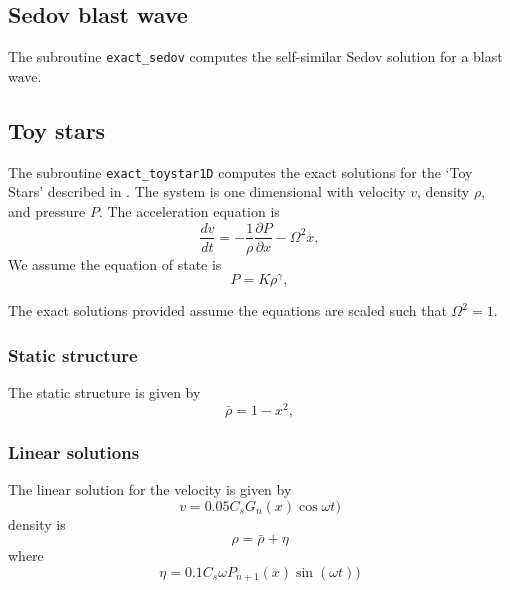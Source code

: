 \documentclass[a4paper,10pt]{article}
\begin{document}
\subsection{Sedov blast wave}
 The subroutine \verb+exact_sedov+ computes the self-similar Sedov solution for a blast wave.

\subsection{Toy stars}
 The subroutine \verb+exact_toystar1D+ computes the exact solutions for the `Toy
Stars' described in \citet{mp04}. The system is one dimensional with velocity $v$, density $\rho$, and pressure
$P$. The acceleration equation is 
\begin{equation}
\frac{dv}{dt} = - \frac{1}{\rho} \frac{\partial P}{\partial x}  - \Omega^2 x,
\end{equation}
 We assume the equation of state is 
\begin{equation}
P = K \rho^\gamma,
\end{equation} 

 The exact solutions provided assume the equations are scaled such that
$\Omega^2 = 1$.
 
\subsubsection{ Static structure}
The static structure is given by
\begin{equation}
\bar \rho = 1- x^2,
\end{equation}

\subsubsection{ Linear solutions}
The linear solution for the velocity is given by
\begin{equation}
v = 0.05 C_s G_n(x) \cos{\omega t} )
\end{equation}
density is
\begin{equation}
\rho = \bar{\rho} + \eta
\end{equation}
where 
\begin{equation}
\eta = 0.1 C_s \omega P_{n+1}(x) \sin{(\omega t)})
\end{equation}
\end{document}
